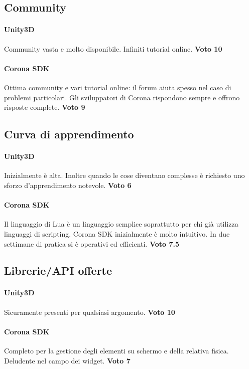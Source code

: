 	\subsection*{Community}
		\paragraph{Unity3D} Community vasta e molto disponibile. Infiniti tutorial online. \textbf{Voto 10}
		\paragraph{Corona SDK} Ottima community e vari tutorial online: il forum aiuta spesso nel caso di problemi particolari. Gli sviluppatori di Corona rispondono sempre e offrono risposte complete. \textbf{Voto 9}
	
	\subsection*{Curva di apprendimento}
		\paragraph{Unity3D} Inizialmente è alta. Inoltre quando le cose diventano complesse è richiesto uno sforzo d'apprendimento notevole. \textbf{Voto 6}
		\paragraph{Corona SDK} Il linguaggio di Lua è un linguaggio semplice soprattutto per chi già utilizza linguaggi di scripting. Corona SDK inizialmente è molto intuitivo. In due settimane di pratica si è operativi ed efficienti. \textbf{Voto 7.5}
	
	\subsection*{Librerie/API offerte}
		\paragraph{Unity3D} Sicuramente presenti per qualsiasi argomento. \textbf{Voto 10}
		\paragraph{Corona SDK} Completo per la gestione degli elementi su schermo e della relativa fisica. Deludente nel campo dei widget. \textbf{Voto 7}
		
